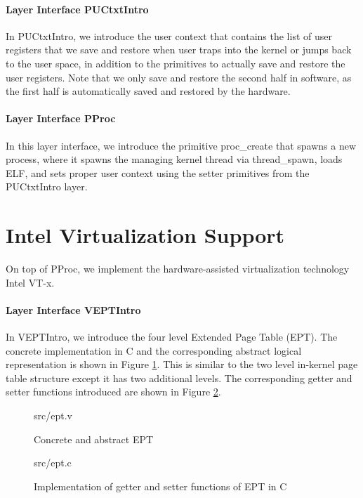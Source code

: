 \paragraph{Layer Interface PUCtxtIntro}

In PUCtxtIntro, we introduce the user context that contains the list of user registers that we save
and restore when user traps into the kernel or jumps back to the user space, in addition to
the primitives to actually save and restore the user registers. Note that we only save and restore the second
half in software, as the first half is automatically saved and restored by the hardware.

\paragraph{Layer Interface PProc}

In this layer interface, we introduce the primitive \textsf{proc\_create} that spawns a new process,
where it spawns the managing kernel thread via \textsf{thread\_spawn}, loads ELF, and sets proper
user context using the setter primitives from the PUCtxtIntro layer.

\section{Intel Virtualization Support}

On top of PProc, we implement the hardware-assisted virtualization technology Intel VT-x.

\paragraph{Layer Interface VEPTIntro}

In VEPTIntro, we introduce the four level Extended Page Table (EPT). The concrete implementation in C
and the corresponding abstract logical representation is shown in Figure \ref{fig:ept_v}.
This is similar to the two level in-kernel page table structure except it has two additional levels.
The corresponding getter and setter functions introduced are shown in Figure \ref{fig:ept_c}.

\begin{figure}
	 {src/ept.v}
	\caption{Concrete and abstract EPT}
	\label{fig:ept_v}
\end{figure}

\begin{figure}
	 {src/ept.c}
	\caption{Implementation of getter and setter functions of EPT in C}
	\label{fig:ept_c}
\end{figure}


